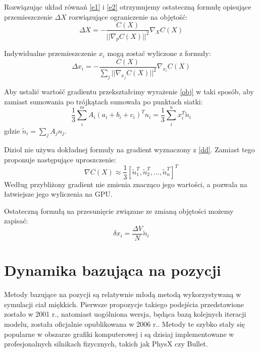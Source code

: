 Rozwiązując układ równań \ref{e1} i \ref{e2} otrzymujemy ostateczną formułę
opisujące przemieszczenie $\Delta X$ rozwiązujące ograniczenie na objętość:
\begin{equation*}
\Delta X = - \frac{C(X)}{||\nabla_p C(X)||^2} \nabla_X C(X)
\end{equation*}

Indywidualne przemieszczenie $x_i$ mogą zostać wyliczone z formuły:
\begin{equation}
\Delta x_i = - \frac{C(X)}{\sum_j ||\nabla_{x_j} C(X)||^2} \nabla_{x_i} C(X)
\end{equation}

Aby ustalić wartość gradientu przekształcimy wyrażenie \ref{obj} w taki sposób,
	aby zamiast sumowania po trójkątach sumowała po punktach siatki:
\begin{equation}
\label{dd}
\frac{1}{3} \sum_i^m A_i (a_i + b_i + c_i)^T n_i = \frac{1}{3} \sum_i^n x_i^T
\tilde{n}_i
\end{equation}
gdzie $\tilde{n}_i = \sum_j A_j n_j$.

Diziol \cite{diziol} nie używa dokładnej formuły na gradient wyznaczony z
\ref{dd}. Zamiast tego proponuje następujące uproszczenie:
\begin{equation}
\nabla C(X) \approx \frac{1}{3} [\tilde{n}^T_1, \tilde{n}^T_2, ...,
	\tilde{n}^T_n]^T
\end{equation}
Według \cite{diziol} przybliżony gradient nie zmienia znacząco jego wartości, a
pozwala na łatwiejsze jego wyliczenia na GPU.

Ostateczną formułą na przesunięcie związane ze zmianą objętości możemy zapisać:
\begin{equation}
\delta x_i = \frac{\Delta V}{N} \tilde{n}_i
\end{equation}



\section{Dynamika bazująca na pozycji}

Metody bazujące na pozycji są relatywnie młodą metodą wykorzystywaną w symulacji
ciał miękkich. Pierwsze propozycje takiego podejścia przedstawione zostało w
2001 r.\cite{jak}, natomiast uogólniona wersja, będąca bazą kolejnych
iteracji modelu, została oficjalnie opublikowana w 2006 r.\cite{pbdyn}. Metody te
szybko stały się popularne w obszarze grafiki komputerowej i są dzisiaj
implementowane w profesjonalnych silnikach fizycznych, takich jak PhysX czy
Bullet.

